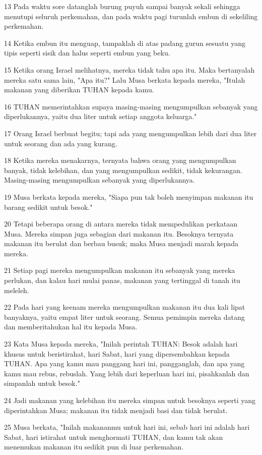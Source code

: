 \par 13 Pada waktu sore datanglah burung puyuh sampai banyak sekali sehingga menutupi seluruh perkemahan, dan pada waktu pagi turunlah embun di sekeliling perkemahan.
\par 14 Ketika embun itu menguap, tampaklah di atas padang gurun sesuatu yang tipis seperti sisik dan halus seperti embun yang beku.
\par 15 Ketika orang Israel melihatnya, mereka tidak tahu apa itu. Maka bertanyalah mereka satu sama lain, "Apa itu?" Lalu Musa berkata kepada mereka, "Itulah makanan yang diberikan TUHAN kepada kamu.
\par 16 TUHAN memerintahkan supaya masing-masing mengumpulkan sebanyak yang diperlukannya, yaitu dua liter untuk setiap anggota keluarga."
\par 17 Orang Israel berbuat begitu; tapi ada yang mengumpulkan lebih dari dua liter untuk seorang dan ada yang kurang.
\par 18 Ketika mereka menakarnya, ternyata bahwa orang yang mengumpulkan banyak, tidak kelebihan, dan yang mengumpulkan sedikit, tidak kekurangan. Masing-masing mengumpulkan sebanyak yang diperlukannya.
\par 19 Musa berkata kepada mereka, "Siapa pun tak boleh menyimpan makanan itu barang sedikit untuk besok."
\par 20 Tetapi beberapa orang di antara mereka tidak mempedulikan perkataan Musa. Mereka simpan juga sebagian dari makanan itu. Besoknya ternyata makanan itu berulat dan berbau busuk; maka Musa menjadi marah kepada mereka.
\par 21 Setiap pagi mereka mengumpulkan makanan itu sebanyak yang mereka perlukan, dan kalau hari mulai panas, makanan yang tertinggal di tanah itu meleleh.
\par 22 Pada hari yang keenam mereka mengumpulkan makanan itu dua kali lipat banyaknya, yaitu empat liter untuk seorang. Semua pemimpin mereka datang dan memberitahukan hal itu kepada Musa.
\par 23 Kata Musa kepada mereka, "Inilah perintah TUHAN: Besok adalah hari khusus untuk beristirahat, hari Sabat, hari yang dipersembahkan kepada TUHAN. Apa yang kamu mau panggang hari ini, pangganglah, dan apa yang kamu mau rebus, rebuslah. Yang lebih dari keperluan hari ini, pisahkanlah dan simpanlah untuk besok."
\par 24 Jadi makanan yang kelebihan itu mereka simpan untuk besoknya seperti yang diperintahkan Musa; makanan itu tidak menjadi basi dan tidak berulat.
\par 25 Musa berkata, "Inilah makananmu untuk hari ini, sebab hari ini adalah hari Sabat, hari istirahat untuk menghormati TUHAN, dan kamu tak akan menemukan makanan itu sedikit pun di luar perkemahan.
